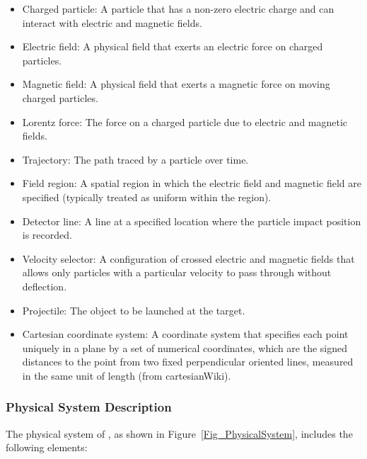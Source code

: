 \documentclass[12pt]{article}
\begin{document}
\begin{itemize}

\item Charged particle: A particle that has a non-zero electric charge and can
interact with electric and magnetic fields.

\item Electric field: A physical field that exerts an electric force on charged
particles.

\item Magnetic field: A physical field that exerts a magnetic force on moving
charged particles.

\item Lorentz force: The force on a charged particle due to electric and
magnetic fields.

\item Trajectory: The path traced by a particle over time.

\item Field region: A spatial region in which the electric field and magnetic
field are specified (typically treated as uniform within the region).

\item Detector line: A line at a specified location where the particle impact
position is recorded.

\item Velocity selector: A configuration of crossed electric and magnetic fields
that allows only particles with a particular velocity to pass through without
deflection.

\item Projectile: The object to be launched at the target.

\item Cartesian coordinate system: A coordinate system that specifies each point uniquely in a plane by a set of numerical coordinates, which are the signed distances to the point from two fixed perpendicular oriented lines, measured in the same unit of length (from cartesianWiki).

\end{itemize}

\subsubsection{Physical System Description} \label{sec_phySystDescrip}

The physical system of \progname{}, as shown in
Figure~\ref{Fig_PhysicalSystem}, includes the following elements:
\end{document}
